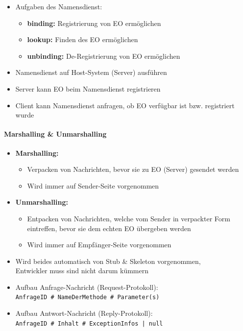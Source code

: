 \documentclass[a4paper]{article}
\begin{document}
\begin{itemize}
				\begin{itemize}
					\item Aufgaben des Namensdienst:
						\begin{itemize}
							\item \textbf{binding:} Registrierung von EO ermöglichen
							\item \textbf{lookup:} Finden des EO ermöglichen
							\item \textbf{unbinding:} De-Registrierung von EO ermöglichen
						\end{itemize}
					\item Namensdienst auf Host-System (Server) ausführen
					\item Server kann EO beim Namensdienst registrieren
					\item Client kann Namensdienst anfragen, ob EO verfügbar ist bzw. registriert wurde
				\end{itemize}
		\end{itemize}
	
				\paragraph{Marshalling \& Unmarshalling}
				
					\begin{itemize}
						\item \textbf{Marshalling:}
						\begin{itemize}
							\item Verpacken von Nachrichten, bevor sie zu EO (Server) gesendet werden
							\item Wird immer auf Sender-Seite vorgenommen									
						\end{itemize}
						\item \textbf{Unmarshalling:}
							\begin{itemize}
								\item Entpacken von Nachrichten, welche vom Sender in verpackter Form eintreffen, bevor sie dem echten EO übergeben werden
								\item Wird immer auf Empfänger-Seite vorgenommen
							\end{itemize}
						\item Wird beides automatisch von Stub \& Skeleton vorgenommen,\\
						Entwickler muss sind nicht darum kümmern
						\item Aufbau Anfrage-Nachricht (Request-Protokoll):\\
								\texttt{AnfrageID \# NameDerMethode \# Parameter(s)}
						\item Aufbau Antwort-Nachricht (Reply-Protokoll):\\
								\texttt{AnfrageID \# Inhalt \# ExceptionInfos | null}
					\end{itemize}
				
\end{document}
